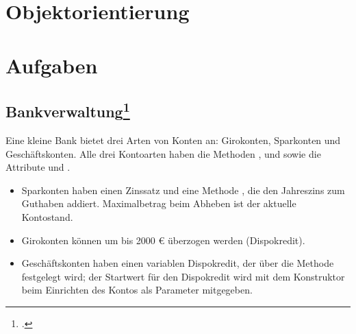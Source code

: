 \documentclass{lehramt-informatik-haupt}
\begin{document}

\chapter{Objektorientierung}


\chapter{Aufgaben}

\section{Bankverwaltung\footcite[Seite 60, Oldenburg, Informatik II, S. 128]{oomup:fs:3}}

Eine kleine Bank bietet drei Arten von Konten an: Girokonten, Sparkonten
und Geschäftskonten. Alle drei Kontoarten haben die Methoden
,  und  sowie die
Attribute  und .

\begin{itemize}
\item Sparkonten haben einen Zinssatz und eine Methode ,
die den Jahreszins zum Guthaben addiert. Maximalbetrag beim Abheben ist
der aktuelle Kontostand.

\item Girokonten können um bis 2000 € überzogen werden (Dispokredit).

\item Geschäftskonten haben einen variablen Dispokredit, der über die
Methode  festgelegt wird; der Startwert für den
Dispokredit wird mit dem Konstruktor beim Einrichten des Kontos als
Parameter mitgegeben.
\end{itemize}
\end{document}

